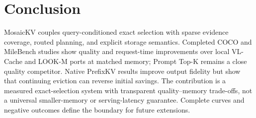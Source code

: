 \section{Conclusion}
MosaicKV couples query-conditioned exact selection with sparse evidence
coverage, routed planning, and explicit storage semantics. Completed COCO and
MileBench studies show quality and request-time improvements over local
VL-Cache and LOOK-M ports at matched memory; Prompt Top-K remains a close
quality competitor. Native PrefixKV results improve output fidelity but show
that continuing eviction can reverse initial savings. The contribution is a
measured exact-selection system with transparent quality--memory trade-offs,
not a universal smaller-memory or serving-latency guarantee. Complete curves
and negative outcomes define the boundary for future extensions.
